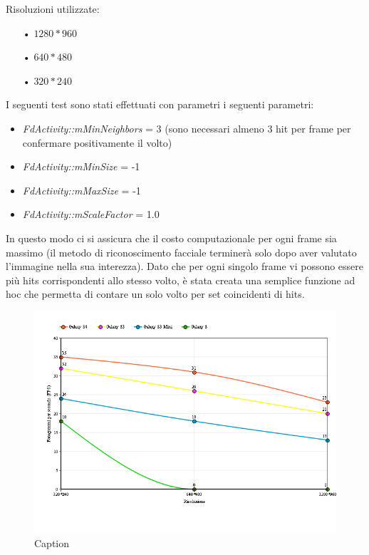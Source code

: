 Risoluzioni utilizzate:

\begin{itemize}
\item[•] $1280\ast960$ 
\item[•] $640\ast480$ 
\item[•] $320\ast240$ 
\end{itemize}

I seguenti test sono stati effettuati con parametri i seguenti parametri:
\begin{itemize}
\item \textit{FdActivity::mMinNeighbors} = 3 (sono necessari almeno 3 hit per frame per confermare positivamente il volto)
\item \textit{FdActivity::mMinSize} = -1  
\item \textit{FdActivity::mMaxSize} = -1
\item \textit{FdActivity::mScaleFactor} = 1.0 
\end{itemize}

In questo modo ci si assicura che il costo computazionale per ogni frame sia massimo (il metodo di riconoscimento facciale terminerà solo dopo aver valutato l'immagine nella sua interezza). 
Dato che per ogni singolo frame vi possono essere più hits corrispondenti allo stesso volto, è stata creata una semplice funzione ad hoc che permetta di contare un solo volto per set coincidenti di hits. 

\begin{figure}[h]\centering  
\includegraphics[scale=0.6]{../Figures/graph_1.png}
\caption[Long caption]{Caption}
\label{pic-a}
\end{figure}

